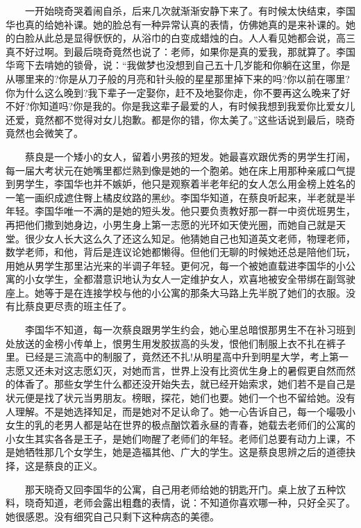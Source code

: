 \documentclass[12pt,UTF8]{ctexbook}
\begin{document}
　　一开始晓奇哭着闹自杀，后来几次就渐渐安静下来了。有时候太快结束，李国华也真的给她补课。她的脸总有一种异常认真的表情，仿佛她真的是来补课的。她的白脸从此总是显得恹恹的，从浴巾的白变成蜡烛的白。人人看见她都会说，高三真不好过啊。到最后晓奇竟然也说了：老师，如果你是真的爱我，那就算了。李国华弯下去啃她的锁骨，说：\enquote{我做梦也没想到自己五十几岁能和你躺在这里，你是从哪里来的?你是从刀子般的月亮和针头般的星星那里掉下来的吗?你以前在哪里?你为什么这么晚到?我下辈子一定娶你，赶不及地娶你走，你不要再这么晚来了好不好?你知道吗?你是我的。你是我这辈子最爱的人，有时候我想到我爱你比爱女儿还爱，竟然都不觉得对女儿抱歉。都是你的错，你太美了。}这些话说到最后，晓奇竟然也会微笑了。

　　蔡良是一个矮小的女人，留着小男孩的短发。她最喜欢跟优秀的男学生打闹，每一届大考状元在她嘴里都烂熟到像是她的一个胞弟。她在床上用那种亲戚口气提到男学生，李国华也并不嫉妒，他只是观察着半老年纪的女人怎么用金榜上姓名的一笔一画织成遮住臀上橘皮纹路的黑纱。李国华知道，在蔡良听起来，半老就是半年轻。李国华唯一不满的是她的短头发。他只要负责教好那一群一中资优班男生，再把他们撒到她身边，小男生身上第一志愿的光环如天使光圈，而她自己就是天堂。很少女人长大这么久了还这么知足。他猜她自己也知道英文老师，物理老师，数学老师，和他，背后是连议论她都懒得。但他们无聊的时候她还总是陪他们玩，用她从男学生那里沾光来的半调子年轻。更何况，每一个被她直载进李国华的小公寓的小女学生，全都潜意识地认为女人一定维护女人，欢喜地被安全带绑在副驾驶座上。她等于是在连接学校与他的小公寓的那条大马路上先半脱了她们的衣服。没有比蔡良更尽责的班主任了。

　　李国华不知道，每一次蔡良跟男学生约会，她心里总暗恨那男生不在补习班到处放送的金榜小传单上，恨男生用发胶拔高的头发，恨他们制服上衣不扎在裤子里。已经是三流高中的制服了，竟然还不扎!从明星高中升到明星大学，考上第一志愿又还未对这志愿幻灭，对她而言，世界上没有比资优生身上的暑假更自然而然的体香了。那些女学生什么都还没开始失去，就已经开始索求，她们若不是自己是状元便是找了状元当男朋友。榜眼，探花，她们也要。她们一个也不留给她。没有人理解。不是她选择知足，而是她对不足认命了。她一心告诉自己，每一个嘬吸小女生的乳的老男人都是站在世界的极点酗饮着永昼的青春，她载去老师们的公寓的小女生其实各各是王子，是她们吻醒了老师们的年轻。老师们总要有动力上课，不是她牺牲那几个女学生，她是造福其他、广大的学生。这是蔡良思辨之后的道德抉择，这是蔡良的正义。

　　那天晓奇又回李国华的公寓，自己用老师给她的钥匙开门。桌上放了五种饮料，晓奇知道，老师会露出粗蠢的表情，说：不知道你喜欢哪一种，只好全买了。她很感恩。没有细究自己只剩下这种病态的美德。
\end{document}
